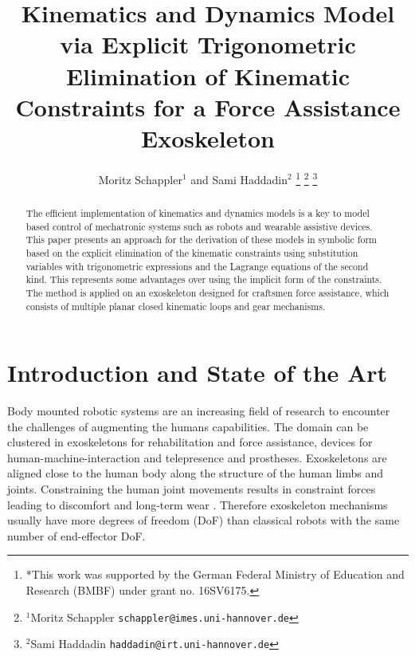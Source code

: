 \documentclass[letterpaper, 10 pt, conference]{ieeeconf}  %
\title{\LARGE \bf
Kinematics and Dynamics Model via Explicit Trigonometric Elimination of Kinematic Constraints for a Force Assistance Exoskeleton
}
\author{Moritz Schappler$^{1}$ and Sami Haddadin$^{2}$%
\thanks{*This work was supported by the German Federal Ministry of Education and Research (BMBF) under grant no. 16SV6175.}%
\thanks{$^{1}$Moritz Schappler
        {\tt\small schappler@imes.uni-hannover.de}}%
\thanks{$^{2}$Sami Haddadin
        {\tt\small haddadin@irt.uni-hannover.de}}%
}
\begin{document}
\maketitle
\thispagestyle{empty}
\pagestyle{empty}


\begin{abstract}

The efficient implementation of kinematics and dynamics models is a key to model based control of mechatronic systems such as robots and wearable assistive devices.
This paper presents an approach for the derivation of these models in symbolic form based on the explicit elimination of the kinematic constraints using substitution variables with trigonometric expressions and the Lagrange equations of the second kind.
This represents some advantages over using the implicit form of the constraints.
%
The method is applied on an exoskeleton designed for craftsmen force assistance, which consists of multiple planar closed kinematic loops and gear mechanisms.

\end{abstract}

\section{Introduction and State of the Art}

Body mounted robotic systems are an increasing field of research to encounter the challenges of augmenting the humans capabilities.
The domain can be clustered in exoskeletons for rehabilitation and force assistance, devices for human-machine-interaction and telepresence and prostheses.
Exoskeletons are aligned close to the human body along the structure of the human limbs and joints.
Constraining the human joint movements results in constraint forces leading to discomfort and long-term wear \cite{Pons2008}.
%
Therefore exoskeleton mechanisms usually have more degrees of freedom (DoF) than classical robots with the same number of end-effector DoF.
\end{document}
